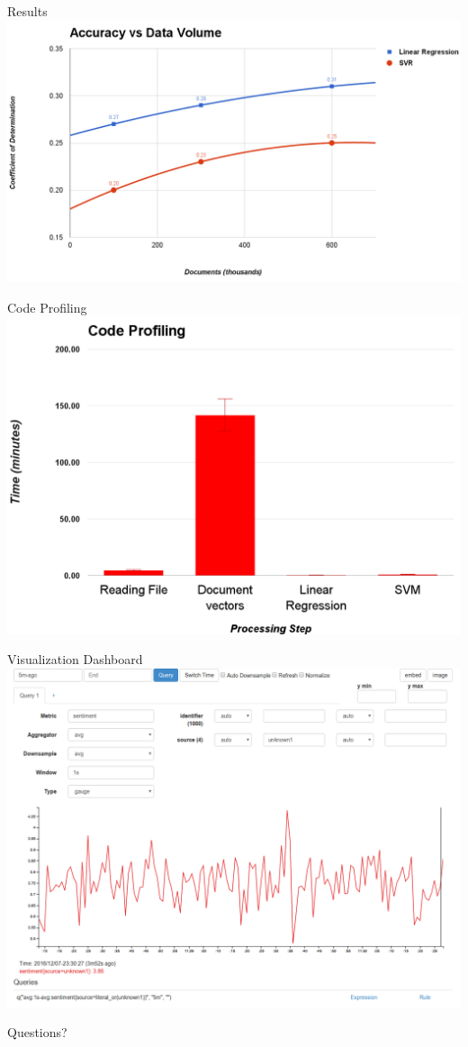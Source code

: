 \documentclass[aspectratio=169]{beamer}
\begin{document}
\begin{frame}{Results}
	\centering
	\includegraphics[width=.9\textwidth]{images/accuracy-vs-data.png}
\end{frame}

\begin{frame}{Code Profiling}
	\centering
	\includegraphics[width=.8\textwidth]{images/code-profiling.png}
\end{frame}

\begin{frame}{Visualization Dashboard}
	\centering
	\includegraphics[width=.8\textwidth]{images/bosun-dash.png}
\end{frame}


\begin{frame}
	\centering
	\Huge{Questions?}
\end{frame}
\end{document}
